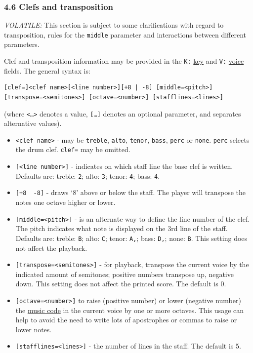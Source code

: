 \documentclass[oneside]{book}
\begin{document}
\hypertarget{clefs_and_transposition}{\subsubsection{4.6 Clefs and
transposition}\label{clefs_and_transposition}}

\emph{VOLATILE:} This section is subject to some clarifications with
regard to transposition, rules for the \texttt{middle} parameter and
interactions between different parameters.

Clef and transposition information may be provided in the \texttt{K:}
\protect\hyperlink{kkey}{key} and \texttt{V:}
\protect\hyperlink{multiple_voices}{voice} fields. The general syntax
is:

\begin{verbatim}
[clef=]<clef name>[<line number>][+8 | -8] [middle=<pitch>] [transpose=<semitones>] [octave=<number>] [stafflines=<lines>]
\end{verbatim}

(where \texttt{\textless{}\ldots{}\textgreater{}} denotes a value,
\texttt{{[}\ldots{}{]}} denotes an optional parameter, and
\texttt{\textbar{}} separates alternative values).

\begin{itemize}
\item
  \texttt{\textless{}clef\ name\textgreater{}} - may be \texttt{treble},
  \texttt{alto}, \texttt{tenor}, \texttt{bass}, \texttt{perc} or
  \texttt{none}. \texttt{perc} selects the drum clef. \texttt{clef=} may
  be omitted.
\item
  \texttt{{[}\textless{}line\ number\textgreater{}{]}} - indicates on
  which staff line the base clef is written. Defaults are: treble:
  \texttt{2}; alto: \texttt{3}; tenor: \texttt{4}; bass: \texttt{4}.
\item
  \texttt{{[}+8\ \textbar{}\ -8{]}} - draws `8' above or below the
  staff. The player will transpose the notes one octave higher or lower.
\item
  \texttt{{[}middle=\textless{}pitch\textgreater{}{]}} - is an alternate
  way to define the line number of the clef. The pitch indicates what
  note is displayed on the 3rd line of the staff. Defaults are: treble:
  \texttt{B}; alto: \texttt{C}; tenor: \texttt{A,}; bass: \texttt{D,};
  none: \texttt{B}. This setting does not affect the playback.
\item
  \texttt{{[}transpose=\textless{}semitones\textgreater{}{]}} - for
  playback, transpose the current voice by the indicated amount of
  semitones; positive numbers transpose up, negative down. This setting
  does not affect the printed score. The default is 0.
\item
  \texttt{{[}octave=\textless{}number\textgreater{}{]}} to raise
  (positive number) or lower (negative number) the
  \protect\hyperlink{music_code_definition}{music code} in the current
  voice by one or more octaves. This usage can help to avoid the need to
  write lots of apostrophes or commas to raise or lower notes.
\item
  \texttt{{[}stafflines=\textless{}lines\textgreater{}{]}} - the number
  of lines in the staff. The default is 5.
\end{itemize}
\end{document}
